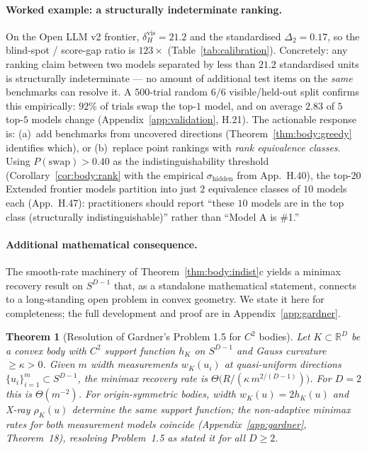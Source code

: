 \documentclass{article}
\newtheorem{theorem}{Theorem}
\begin{document}
\paragraph{Worked example: a structurally indeterminate ranking.}
On the Open LLM v2 frontier, $\delta_H^{\mathrm{vis}} = 21.2$ and the
standardised $\Delta_2 = 0.17$, so the blind-spot / score-gap ratio
is $123\times$ (Table~\ref{tab:calibration}).
Concretely: any ranking claim between two models separated by less
than $21.2$ standardised units is structurally indeterminate --- no
amount of additional test items on the \emph{same} benchmarks can
resolve it. A $500$-trial random $6/6$ visible/held-out split confirms
this empirically: $92\%$ of trials swap the top-$1$ model, and on
average $2.83$ of $5$ top-$5$ models change
(Appendix~\ref{app:validation}, H.21).
The actionable response is: (a)~add benchmarks from uncovered
directions (Theorem~\ref{thm:body:greedy} identifies which), or
(b)~replace point rankings with \emph{rank equivalence classes}.
Using $P(\mathrm{swap}) > 0.40$ as the indistinguishability threshold
(Corollary~\ref{cor:body:rank} with the empirical
$\sigma_{\mathrm{hidden}}$ from App.~H.40), the top-$20$ Extended
frontier models partition into just $2$ equivalence classes of $10$
models each (App.~H.47): practitioners should report ``these $10$
models are in the top class (structurally indistinguishable)'' rather
than ``Model A is \#1.''

\paragraph{Additional mathematical consequence.}
The smooth-rate machinery of Theorem~\ref{thm:body:indist}c yields
a minimax recovery result on $S^{D-1}$ that, as a standalone
mathematical statement, connects to a long-standing open problem in
convex geometry. We state it here for completeness; the full
development and proof are in Appendix~\ref{app:gardner}.

\begin{theorem}[Resolution of Gardner's Problem 1.5 for $C^2$ bodies]
\label{thm:body:gardner}
Let $K \subset \mathbb{R}^D$ be a convex body with $C^2$ support
function $h_K$ on $S^{D-1}$ and Gauss curvature $\ge \kappa > 0$.
Given $m$ width measurements $w_K(u_i)$ at quasi-uniform directions
$\{u_i\}_{i=1}^m \subset S^{D-1}$, the minimax recovery rate is
$\Theta\!\big(R / (\kappa\, m^{2/(D-1)})\big)$. For $D = 2$ this is
$\Theta(m^{-2})$. For origin-symmetric bodies, width $w_K(u) = 2h_K(u)$
and X-ray $\rho_K(u)$ determine the same support function; the
non-adaptive minimax rates for both measurement models coincide
(Appendix~\ref{app:gardner}, Theorem~18), resolving Problem~1.5
as \citet{gardner1995geometric} stated it for all $D \ge 2$.
\end{theorem}
\end{document}
